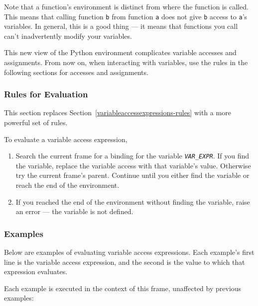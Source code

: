 \documentclass{article}
\newcommand{\expr}[1]{\texttt{#1}}
\newcommand{\mvar}[1]{\expr{\emph{\uppercase{#1}}}}
\begin{document}
  Note that a function's environment is distinct from where the function is called. This means that calling function \expr{b} from function \expr{a} does not give \expr{b} access to \expr{a}'s variables. In general, this is a good thing --- it means that functions you call can't inadvertently modify your variables.

  This new view of the Python environment complicates variable accesses and assignments. From now on, when interacting with variables, use the rules in the following sections for accesses and assignments.

\subsubsection{Rules for Evaluation}

This section replaces Section~\ref{variableaccessexpressions-rules} with a
more powerful set of rules.

  To evaluate a variable access expression,

  \begin{enumerate}
    \item
    Search the current frame for a binding for the variable
    \mvar{VAR\_EXPR}.  If you find the variable, replace the variable
    access with that variable's value.  Otherwise try the current frame's
    parent.  Continue until you either find the variable or reach the end
    of the environment.

    \item
    If you reached the end of the environment without finding the variable, raise an error --- the variable is not defined.
  \end{enumerate}

\subsubsection{Examples}

  Below are examples of evaluating variable access expressions. Each example's first line is the variable access expression, and the second is the value to which that expression evaluates.

Each example is executed in the context of this frame, unaffected by previous examples:
\end{document}
